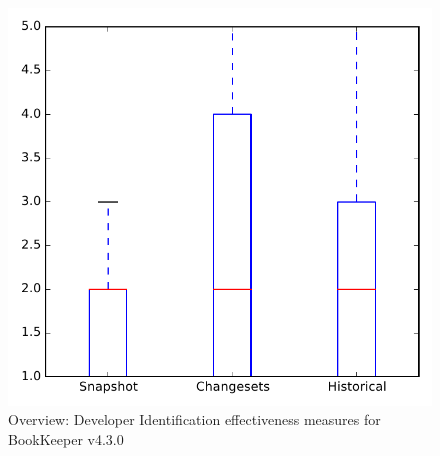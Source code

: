 
\begin{figure}
\centering
\includegraphics[height=0.4\textheight]{figures/dit/all_bookkeeper_no_outlier}
\caption{Overview: Developer Identification effectiveness measures for BookKeeper v4.3.0}
\label{fig:dit:all:bookkeeper}
\end{figure}
